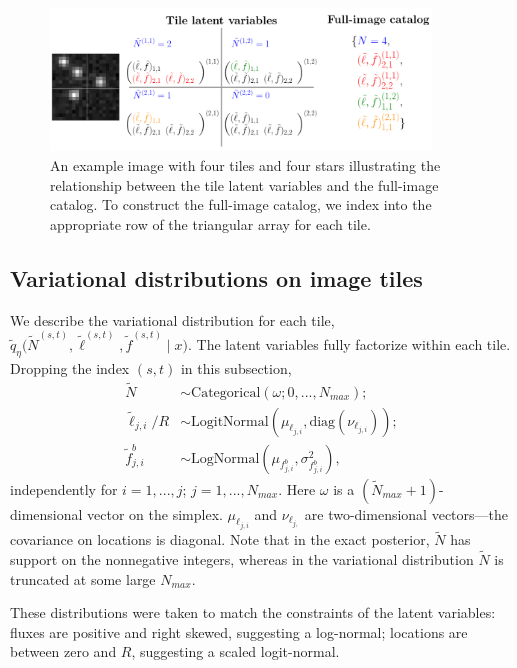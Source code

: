\begin{figure}[tb]
    \centering
    \includegraphics[width = 0.9\textwidth]{figures/vi_figures/tile_to_full_schematic.png}
    \caption{An example image with four tiles and four stars illustrating the relationship between the tile latent variables and the full-image catalog.
    To construct the full-image catalog, we index into the appropriate row of the triangular array for each tile.}
    \label{fig:tile_to_full_schm}
\end{figure}


\subsection{Variational distributions on image tiles}
\label{sec:distr_on_tiles}
We describe the variational distribution for each tile,
$\tilde q_\eta\big(\tilde N^{(s, t)}, \tilde \ell^{(s, t)}, \tilde f^{(s, t)} \mid x\big)$.
The latent variables fully factorize within each tile.
Dropping the index
$(s,t)$ in this subsection,
\begin{align}
    \tilde N &\sim \text{Categorical}(
    \omega; 0, ..., N_{max});  \label{eq:var_distr_n}\\
	\tilde \ell_{j, i} / R &\sim \text{LogitNormal}(\mu_{\ell_{j, i}}, \text{diag}(\nu_{\ell_{j, i}}) )\label{eq:var_distr_loc}; \\
	\tilde f^b_{j, i} &\sim \text{LogNormal}(\mu_{f^b_{j, i}}, \sigma^2_{f^b_{j, i}}), \label{eq:var_distr_f}
\end{align}
independently for $i = 1, ..., j$; $j = 1, ..., N_{max}$.
Here $\omega$ is a $(\tilde N_{max} + 1)$-dimensional vector on the simplex. $\mu_{\ell_{j, i}}$ and $\nu_{\ell_{j, }}$ are two-dimensional vectors---the covariance on locations is diagonal.
Note that in the exact posterior, $\tilde N$ has support on the nonnegative integers, whereas in the variational distribution $\tilde N$ is truncated at some large $N_{max}$.


These distributions were taken to match the constraints of the latent variables: fluxes are positive and right skewed, suggesting a log-normal; locations are between zero and $R$, suggesting a scaled logit-normal.

